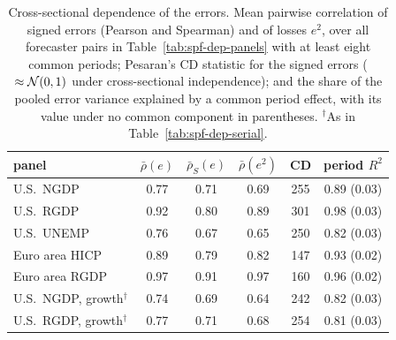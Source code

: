 \begin{table}[htb]
  \centering
  \caption[Cross-sectional dependence in SPF errors]{Cross-sectional dependence of the errors. Mean pairwise
  correlation of signed errors (Pearson and Spearman) and of losses $e^2$, over all forecaster pairs in
  Table~\ref{tab:spf-dep-panels} with at least eight common periods; Pesaran's CD statistic for the signed errors
  ($\approx\mathcal{N}(0,1)$ under cross-sectional independence); and the share of the pooled error variance explained
  by a common period effect, with its value under no common component in parentheses. $^\dagger$As in
  Table~\ref{tab:spf-dep-serial}.}
  \label{tab:spf-dep-cross}
  \small
  \begin{tabular}{lccccc}
    \toprule
    panel & $\bar\rho(e)$ & $\bar\rho_S(e)$ & $\bar\rho(e^2)$ & CD & period $R^2$\\
    \midrule
    U.S.\ NGDP & 0.77 & 0.71 & 0.69 & 255 & 0.89 (0.03)\\
    U.S.\ RGDP & 0.92 & 0.80 & 0.89 & 301 & 0.98 (0.03)\\
    U.S.\ UNEMP & 0.76 & 0.67 & 0.65 & 250 & 0.82 (0.03)\\
    Euro area HICP & 0.89 & 0.79 & 0.82 & 147 & 0.93 (0.02)\\
    Euro area RGDP & 0.97 & 0.91 & 0.97 & 160 & 0.96 (0.02)\\
    \midrule
    U.S.\ NGDP, growth$^\dagger$ & 0.74 & 0.69 & 0.64 & 242 & 0.82 (0.03)\\
    U.S.\ RGDP, growth$^\dagger$ & 0.77 & 0.71 & 0.68 & 254 & 0.81 (0.03)\\
    \bottomrule
  \end{tabular}
\end{table}
